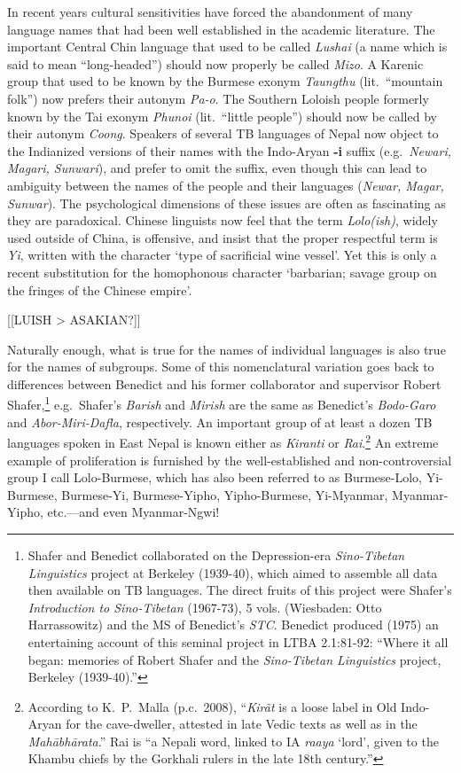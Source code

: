 In recent years cultural sensitivities have forced the abandonment of many
language names that had been well established in the academic literature.  The
important Central Chin language that used to be called \textit{Lushai} (a name which is
said to mean “long-headed”) should now properly be called \textit{Mizo}.
A Karenic group
that used to be known by the Burmese exonym \textit{Taungthu} (lit.\ “mountain folk”) now
prefers their autonym \textit{Pa-o}.  The Southern Loloish people
formerly known by the Tai exonym \textit{Phunoi} (lit.\ “little people”) should now be
called by their autonym \textit{Coong}.  Speakers of several TB languages of Nepal now
object to the Indianized versions of their names with the Indo-Aryan \textbf{-i} suffix
(e.g.\ \textit{Newari, Magari, Sunwari}), and prefer to omit the suffix, even though this
can lead to ambiguity between the names of the people and their languages
(\textit{Newar, Magar, Sunwar}).  The psychological dimensions of these issues are often
as fascinating as they are paradoxical.  Chinese linguists now feel that the
term \textit{Lolo(ish)}, widely used outside of China,
is offensive, and insist that the
proper respectful term is \textit{Yi}, written with the character  ‘type of
sacrificial wine vessel’.  Yet this is only a recent substitution for the
homophonous character  ‘barbarian; savage group on the fringes of the Chinese
empire’.

[[LUISH > ASAKIAN?]]


Naturally enough, what is true for the names of individual languages is also
true for the names of subgroups.  Some of this nomenclatural variation goes back
to differences between Benedict and his former collaborator and supervisor
Robert Shafer,\footnote{Shafer and Benedict collaborated on the Depression-era
\textit{Sino-Tibetan Linguistics} project at Berkeley (1939-40), which aimed to assemble
all data then available on TB languages.  The direct fruits of this project were
Shafer’s \textit{Introduction to Sino-Tibetan} (1967-73), 5 vols. (Wiesbaden: Otto
Harrassowitz) and the MS of Benedict’s \textit{STC}.  Benedict produced (1975) an
entertaining account of this seminal project in LTBA 2.1:81-92: “Where it all
began: memories of Robert Shafer and the \textit{Sino-Tibetan Linguistics} project,
Berkeley (1939-40).”} e.g.\ Shafer’s \textit{Barish} and \textit{Mirish} are the same as Benedict’s
\textit{Bodo-Garo} and \textit{Abor-Miri-Dafla}, respectively.  An important group of at least a
dozen TB languages spoken in East Nepal is known either as \textit{Kiranti} or
\textit{Rai}.\footnote{According to K.~P.~Malla (p.c.~2008), “\textit{Kirãt} is a loose label in Old Indo-Aryan for the cave-dweller, attested in late Vedic texts as well as in the \textit{Mahābhārata}.” Rai is “a Nepali word, linked to IA \textit{raaya} ‘lord’, given to the Khambu chiefs by the Gorkhali rulers in the late 18th century.”}
  An extreme example of proliferation is furnished by the well-established and
non-controversial group I call Lolo-Burmese, which has also been referred to as
Burmese-Lolo, Yi-Burmese, Burmese-Yi, Burmese-Yipho, Yipho-Burmese, Yi-Myanmar,
Myanmar-Yipho, etc.—and even Myanmar-Ngwi!


